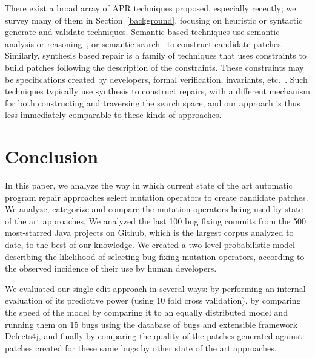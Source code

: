 \documentclass[conference]{IEEEtran}
\begin{document}
There exist a broad array of APR techniques proposed, especially recently; we
survey many of them in Section~\ref{background}, focusing on heuristic or
syntactic generate-and-validate techniques.  Semantic-based techniques use
semantic analysis or reasoning~\cite{nguyen13,mechtaev15,Mechtaev2016}, or
semantic search~\cite{ke15} to construct candidate patches.  Similarly,
synthesis based repair is a family of techniques that uses constraints to build
patches following the description of the constraints. These constraints may be
specifications created by developers, formal verification, invariants,
etc.~\cite{jin11,wei10}.  Such techniques typically use synthesis to construct
repairs, with a different mechanism for both constructing and traversing the
search space, and our approach is thus less immediately comparable to these kinds of approaches.
 

\section{Conclusion} \label{conclusion}

In this paper, we analyze the way in which current state of the art automatic 
program repair approaches select mutation operators to create candidate 
patches. We analyze, categorize and compare the mutation operators being used by 
state of the art approaches. We analyzed the last 100 bug fixing commits from the
500 most-starred Java projects on Github, which is the largest corpus analyzed
to date, to the best of our knowledge.  We created a two-level probabilistic model describing
the likelihood of selecting bug-fixing mutation operators, according to the
observed incidence of their use by human developers. 

We evaluated our single-edit approach in several ways: by performing an internal evaluation of 
its predictive power (using 10 fold cross 
validation), by comparing the speed of the model by comparing it to an equally distributed model and  
 running them on 15 bugs using the database of bugs and extensible 
framework Defects4j, and finally by comparing the quality of the patches generated against patches created for these same bugs by other state of the art approaches. 
\end{document}

